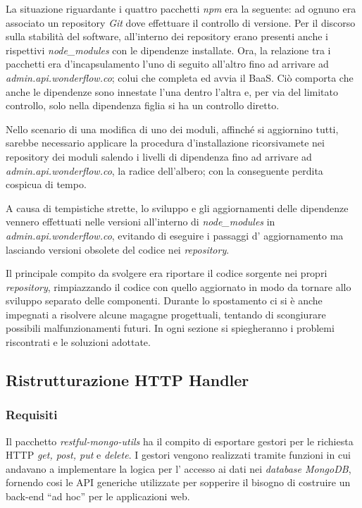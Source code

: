 La situazione riguardante i quattro pacchetti \textit{npm} era la seguente: ad
ognuno era associato un repository \textit{Git} dove effettuare il controllo di
versione. Per il discorso sulla stabilità del software, all'interno dei
repository erano presenti anche i rispettivi \textit{node\_modules} con le
dipendenze installate. Ora, la relazione tra i pacchetti era d'incapsulamento
l'uno di seguito all'altro fino ad arrivare ad \textit{admin.api.wonderflow.co};
colui che completa ed avvia il \gls{BaaS}. Ciò comporta che anche le dipendenze
sono innestate l'una dentro l'altra e, per via del limitato controllo, solo
nella dipendenza figlia si ha un controllo diretto.

Nello scenario di una modifica di uno dei moduli, affinché si aggiornino
tutti, sarebbe necessario applicare la procedura d'installazione ricorsivamete
nei repository dei moduli salendo i livelli di dipendenza fino ad arrivare ad
\textit{admin.api.wonderflow.co}, la radice dell'albero; con la conseguente
perdita cospicua di tempo.

A causa di tempistiche strette, lo sviluppo e gli aggiornamenti delle dipendenze
vennero effettuati nelle versioni all'interno di \textit{node\_modules} in
\textit{admin.api.wonderflow.co}, evitando di eseguire i passaggi d'
aggiornamento ma lasciando versioni obsolete del codice nei \textit{repository}.

Il principale compito da svolgere era riportare il codice sorgente nei propri
\textit{repository}, rimpiazzando il codice con quello aggiornato in modo da
tornare allo sviluppo separato delle componenti. Durante lo spostamento ci si è
anche impegnati a risolvere alcune magagne progettuali, tentando di scongiurare
possibili malfunzionamenti futuri. In ogni sezione si spiegheranno i problemi
riscontrati e le soluzioni adottate.

\subsection{Ristrutturazione HTTP Handler}
\subsubsection{Requisiti}
Il pacchetto \textit{restful-mongo-utils} ha il compito di esportare gestori per
le richiesta HTTP \textit{get, post, put} e \textit{delete}. I gestori vengono
realizzati tramite funzioni in cui andavano a implementare la logica per l'
accesso ai dati nei \textit{database MongoDB}, fornendo cosi le \gls{API}
generiche utilizzate per sopperire il bisogno di costruire un \gls{back-end}
``ad hoc'' per le applicazioni web.

